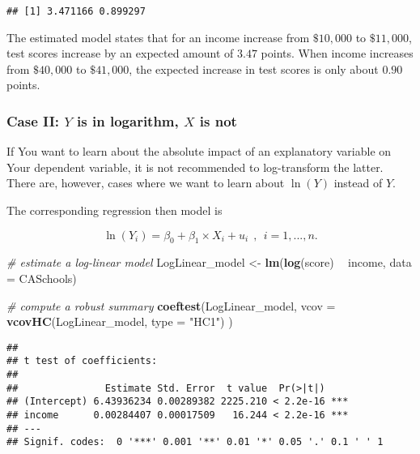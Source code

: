 \documentclass[]{book}
\newenvironment{Shaded}{\begin{snugshade}}{\end{snugshade}}
\newcommand{\KeywordTok}[1]{\textcolor[rgb]{0.13,0.29,0.53}{\textbf{#1}}}
\newcommand{\DataTypeTok}[1]{\textcolor[rgb]{0.13,0.29,0.53}{#1}}
\newcommand{\StringTok}[1]{\textcolor[rgb]{0.31,0.60,0.02}{#1}}
\newcommand{\CommentTok}[1]{\textcolor[rgb]{0.56,0.35,0.01}{\textit{#1}}}
\newcommand{\OperatorTok}[1]{\textcolor[rgb]{0.81,0.36,0.00}{\textbf{#1}}}
\newcommand{\NormalTok}[1]{#1}
\theoremstyle{definition}
\theoremstyle{definition}
\theoremstyle{definition}
\theoremstyle{remark}
\begin{document}
\begin{verbatim}
## [1] 3.471166 0.899297
\end{verbatim}

The estimated model states that for an income increase from \(\$10,000\)
to \(\$11,000\), test scores increase by an expected amount of \(3.47\)
points. When income increases from \(\$40,000\) to \(\$41,000\), the
expected increase in test scores is only about \(0.90\) points.

\subsubsection*{\texorpdfstring{Case II: \(Y\) is in logarithm, \(X\) is
not}{Case II: Y is in logarithm, X is not}}\label{case-ii-y-is-in-logarithm-x-is-not}

If You want to learn about the absolute impact of an explanatory
variable on Your dependent variable, it is not recommended to
log-transform the latter. There are, however, cases where we want to
learn about \(\ln(Y)\) instead of \(Y\).

The corresponding regression then model is

\[ \ln(Y_i) = \beta_0 + \beta_1 \times X_i + u_i \ \ , \ \ i=1,...,n. \]

\begin{Shaded}
\begin{Highlighting}[]
\CommentTok{# estimate a log-linear model }
\NormalTok{LogLinear_model <-}\StringTok{ }\KeywordTok{lm}\NormalTok{(}\KeywordTok{log}\NormalTok{(score) }\OperatorTok{~}\StringTok{ }\NormalTok{income, }\DataTypeTok{data =}\NormalTok{ CASchools)}

\CommentTok{# compute a robust summary}
\KeywordTok{coeftest}\NormalTok{(LogLinear_model, }
         \DataTypeTok{vcov =} \KeywordTok{vcovHC}\NormalTok{(LogLinear_model, }\DataTypeTok{type =} \StringTok{"HC1"}\NormalTok{)}
\NormalTok{         )}
\end{Highlighting}
\end{Shaded}

\begin{verbatim}
## 
## t test of coefficients:
## 
##               Estimate Std. Error  t value  Pr(>|t|)    
## (Intercept) 6.43936234 0.00289382 2225.210 < 2.2e-16 ***
## income      0.00284407 0.00017509   16.244 < 2.2e-16 ***
## ---
## Signif. codes:  0 '***' 0.001 '**' 0.01 '*' 0.05 '.' 0.1 ' ' 1
\end{verbatim}
\end{document}
